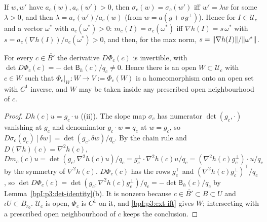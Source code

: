 \begin{remark}\label{bpI:p3:slope-ray}
If $w,w'$ have $a_c(w),a_c(w')>0$, then $\sigma_c(w)=\sigma_c(w')$ iff $w'=\lambda w$ for some $\lambda>0$, and then $\lambda=a_c(w')/a_c(w)$
(from $w=a(g+\sigma g^\perp)$). Hence for $I\in\mathcal U_c$ and a vector $\omega^*$ with $a_c(\omega^*)>0$:
$m_c(I)=\sigma_c(\omega^*)$ iff $\nabla h(I)=s\,\omega^*$ with $s=a_c(\nabla h(I))/a_c(\omega^*)>0$, and then, for the max norm,
$s=\lVert \nabla h(I)\rVert/\lVert \omega^*\rVert$.
\end{remark}

\begin{lemma}\label{bpI:p3:chart}
For every $c\in\overline{B'}$ the derivative $D\Phi_c(c)$ is invertible, with $\det D\Phi_c(c)=-\det\mathsf B_h(c)/q_c\ne0$. Hence there is an open
$W\subset\mathcal U_c$ with $c\in W$ such that $\Phi_c|_W:W\to V:=\Phi_c(W)$ is a homeomorphism onto an open set with $C^1$ inverse,
and $W$ may be taken inside any prescribed open neighbourhood of $c$.
\end{lemma}
\begin{proof}
\label{stepI:p3:ch-deriv}
$Dh(c)u=g_c\cdot u$ ((ii)). The slope map $\sigma_c$ has numerator $\det(g_c,\cdot)$ vanishing at $g_c$ and denominator $g_c\cdot w=q_c$ at $w=g_c$, so
$D\sigma_c(g_c)[\delta w]=\det(g_c,\delta w)/q_c$. By the chain rule and $D(\nabla h)(c)=\nabla^2h(c)$,
$Dm_c(c)u=\det(g_c,\nabla^2h(c)u)/q_c=g_c^\perp\cdot\nabla^2h(c)u/q_c=(\nabla^2h(c)g_c^\perp)\cdot u/q_c$ by the symmetry of $\nabla^2h(c)$.
\label{stepI:p3:ch-det}
$D\Phi_c(c)$ has the rows $g_c^\top$ and $(\nabla^2h(c)g_c^\perp)^\top/q_c$, so $\det D\Phi_c(c)=\det(g_c,\nabla^2h(c)g_c^\perp)/q_c=-\det\mathsf B_h(c)/q_c$
by Lemma~\ref{bpI:p3:det-identity}(b). It is nonzero because $c\in\overline{B'}\subset B\subset U$ and $\iota U\subset B_{r_0}$.
\label{stepI:p3:ch-ift}
$\mathcal U_c$ is open, $\Phi_c$ is $C^1$ on it, and \ref{bpI:p3:ext-ift} gives $W$; intersecting with a prescribed open neighbourhood of $c$ keeps the conclusion.
\end{proof}

